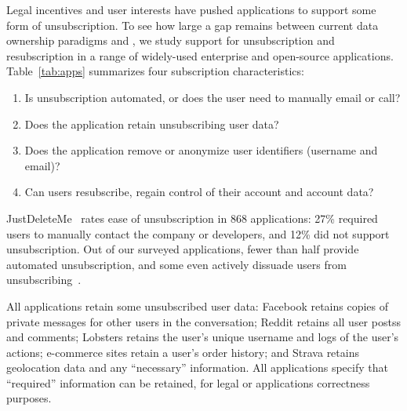 %
Legal incentives and user interests have pushed applications to support some form of unsubscription.
To see how large a gap remains between current data ownership paradigms and \name, we study support
for unsubscription and resubscription in a range of widely-used enterprise and open-source
applications. 
%
Table~\ref{tab:apps} summarizes four subscription characteristics: 
\begin{enumerate}
    \item Is unsubscription automated, or does the user need to manually email or call? 
    \item Does the application retain unsubscribing user data?
    \item Does the application remove or anonymize user identifiers (\eg username and email)?
    \item Can users resubscribe, \ie regain control of their account and account data?
\end{enumerate}
JustDeleteMe~\cite{jdm} rates ease of unsubscription in 868 applications: 27\% required users to manually
contact the company or developers, and 12\% did not support unsubscription. 
Out of our surveyed applications, fewer than half provide automated unsubscription, and some even actively dissuade users from unsubscribing~\cite{nytimes:amazonsub}. 

All applications retain some unsubscribed user data: Facebook retains copies of private messages for
other users in the conversation; Reddit retains all user postss and comments; Lobsters retains the
user's unique username and logs of the user's actions; e-commerce sites retain a user's order
history; and Strava retains geolocation data and any ``necessary'' information. All applications
specify that ``required'' information can be retained, for legal or applications correctness
purposes.%

